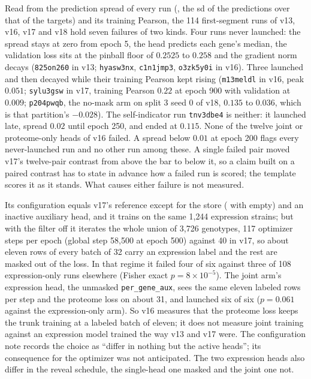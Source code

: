  Read from the
prediction spread of every run (, the sd of the predictions
over that of the targets) and its training Pearson, the 114 first-segment runs of v13, v16,
v17 and v18 hold seven failures of two kinds. Four runs never launched: the spread stays at
zero from epoch 5, the head predicts each gene's median, the validation loss sits at the
pinball floor of $0.2525$ to $0.258$ and the gradient norm decays (\texttt{825on260} in v13;
\texttt{hyasw3nx}, \texttt{c1n1jmp3}, \texttt{o3zk5y0i} in v16). Three launched and then
decayed while their training Pearson kept rising (\texttt{m13meldl} in v16, peak $0.051$;
\texttt{sylu3gsw} in v17, training Pearson $0.22$ at epoch 900 with validation at $0.009$;
\texttt{p204pwqb}, the no-mask arm on split 3 seed 0 of v18, $0.135$ to $0.036$, which is
that partition's $-0.028$). The self-indicator run \texttt{tnv3dbe4} is neither: it launched
late, spread $0.02$ until epoch 250, and ended at $0.115$. None of the twelve joint or
proteome-only heads of v16 failed. A spread below $0.01$ at epoch 200 flags every
never-launched run and no other run among these. A single failed pair moved v17's
twelve-pair contrast from above the bar to below it, so a claim built on a paired contrast
has to state in advance how a failed run is scored; the template scores it as it stands.
What causes either failure is not measured.

Its configuration equals v17's reference except for the store ( with
 empty) and an inactive auxiliary head, and it trains on the same
1{,}244 expression strains; but with the filter off it iterates the whole union of 3{,}726
genotypes, 117 optimizer steps per epoch (global step 58{,}500 at epoch 500) against 40 in
v17, so about eleven rows of every batch of 32 carry an expression label and the rest are
masked out of the loss. In that regime it failed four of six against three of 108
expression-only runs elsewhere (Fisher exact $p = 8 \times 10^{-5}$). The joint arm's
expression head, the unmasked \texttt{per\_gene\_aux}, sees the same eleven labeled rows
per step and the proteome loss on about 31, and launched six of six ($p = 0.061$ against
the expression-only arm). So v16 measures that the proteome loss keeps the trunk training
at a labeled batch of eleven; it does not measure joint training against an expression
model trained the way v13 and v17 were. The configuration note records the choice as
``differ in nothing but the active heads''; its consequence for the optimizer was not
anticipated. The two expression heads also differ in the reveal schedule, the single-head
one masked and the joint one not.

